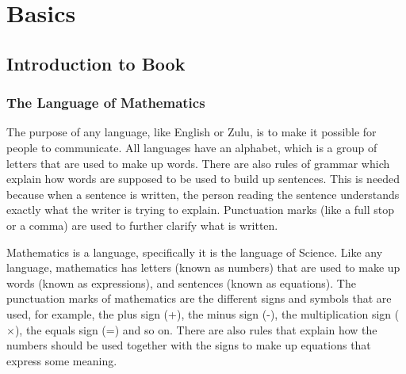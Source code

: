 \documentclass[10pt,a4paper,titlepage,twoside,openright]{report}
\begin{document}
\pagestyle{fancy}
\renewcommand{\sectionmark}[1]{\markright{\thesection}{}}
\renewcommand{\footrulewidth}{0.4pt}

\cleardoublepage
\tableofcontents
\cleardoublepage
{}\part{Basics}














\chapter{Introduction to Book}
\label{mathintro}

\section{The Language of Mathematics}
The purpose of any language, like English or Zulu, is to make it possible for people to communicate. All languages have an alphabet, which is a group of letters that are used to make up words. There are also rules of grammar which explain how words are supposed to be used to build up sentences. This is needed because when a sentence is written, the person reading the sentence understands exactly what the writer is trying to explain. Punctuation marks (like a full stop or a comma) are used to further clarify what is written.

Mathematics is a language, specifically it is the language of Science. Like any language, mathematics has letters (known as numbers) that are used to make up words (known as expressions), and sentences (known as equations). The punctuation marks of mathematics are the different signs and symbols that are used, for example, the plus sign (+), the minus sign (-), the multiplication sign ($\times$), the equals sign (=) and so on. There are also rules that explain how the numbers should be used together with the signs to make up equations that express some meaning.

\end{document}
